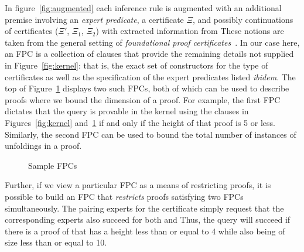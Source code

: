 \smallskip
In figure~\ref{fig:augmented}  each
inference rule is augmented with an additional premise involving an
\emph{expert predicate}, a certificate $\Xi$, and possibly continuations of
certificates ($\Xi'$, $\Xi_1$, $\Xi_2$) with extracted information from
These notions are taken from the general setting of \emph{foundational
  proof certificates}~\cite{chihani17jar}.
%
In our case here, an FPC is a collection of \lP clauses that
provide the remaining details not supplied in Figure~\ref{fig:kernel}:
that is, the exact set of constructors for the  type of certificates as
well as the specification of the expert predicates listed \emph{ibidem}.
%
The top of Figure~\ref{fig:resources} displays two such FPCs,
both of which can be used to describe proofs where we bound
the dimension of  a proof.
%
For example, the first FPC dictates that the query \mbox{} is
provable in  the kernel using the clauses in Figures~\ref{fig:kernel}
and~\ref{fig:resources} if and only if the height of that proof is 5
or less.
%
Similarly, the second FPC can be used to bound the total number of instances of
unfoldings in a proof.
%

\begin{figure}[t]


\caption{Sample FPCs}
\label{fig:resources}
\end{figure}

Further, if we view a particular FPC as a means of restricting proofs, it is
possible to build an FPC that \emph{restricts} proofs satisfying two FPCs
simultaneously.
%
%
The pairing experts for the certificate  simply
request that the corresponding experts also succeed for both
 and  
%
Thus, the query 
will succeed if there is a proof of  that has a height less
than or equal to 4 while also being of size less than or equal to 10.

